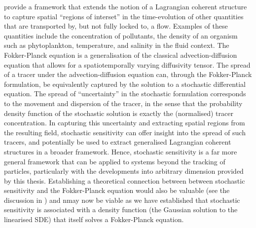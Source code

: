 \citet{BalasuriyaEtAl_2018_GeneralizedLagrangianCoherent} provide a framework that extends the notion of a Lagrangian coherent structure to capture spatial ``regions of interset'' in the time-evolution of other quantities that are transported by, but not fully locked to, a flow.
Examples of these quantities include the concentration of pollutants, the density of an organism such as phytoplankton, temperature, and salinity in the fluid context.
The Fokker-Planck equation is a generalisation of the classical advection-diffusion equation that allows for a spatiotemporally varying diffusivity tensor.
The spread of a tracer under the advection-diffusion equation can, through the Fokker-Planck formulation, be equivalently captured by the solution to a stochastic differential equation.
The spread of ``uncertainty'' in the stochastic formulation corresponds to the movement and dispersion of the tracer, in the sense that the probability density function of the stochastic solution is exactly the (normalised) tracer concentration.
In capturing this uncertainty and extracting spatial regions from the resulting field, stochastic sensitivity can offer insight into the spread of such tracers, and potentially be used to extract generalised Lagrangian coherent structures in a broader framework.
Hence, stochastic sensitivity is a far more general framework that can be applied to systems beyond the tracking of particles, particularly with the developments into arbitrary dimension provided by this thesis.
Establishing a theoretical connection between between stochastic sensitivity and the Fokker-Planck equation would also be valuable (see the discussion in \citet{Balasuriya_2020_StochasticApproachesLagrangian}) and nmay now be viable as we have established that stochastic sensitivity is associated with a density function (the Gaussian solution to the linearised SDE) that itself solves a Fokker-Planck equation.


